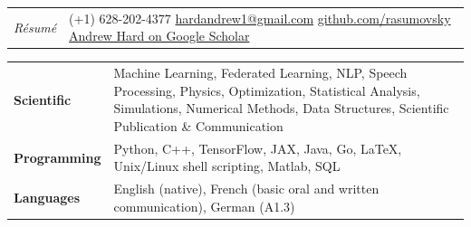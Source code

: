 \documentclass{letter}
\begin{document}

\begin{tabular}{p{}p{}}
  \hfill \newline \href{https://ch.linkedin.com/in/andrew-hard-25b690a5}{\Huge{\color{Maroon}{Andrew Hard}}} \newline \LARGE{\textit{R\'{e}sum\'{e}}} \newline
  &
  \hfill \newline %
  (+1) 628-202-4377 \newline
  \href{mailto:hardandrew1@gmail.com}{hardandrew1@gmail.com} \newline
  \href{https://github.com/rasumovsky}{github.com/rasumovsky} \newline
  \href{https://scholar.google.com/citations?hl=en&user=hJBLsu8AAAAJ}{Andrew Hard on Google Scholar}\\
\end{tabular}



\begin{flushleft}
  \Large{\textsc{\textbf{\color{Maroon}{Skills}}}}
  \vspace{1pt}  %
\end{flushleft}

\begin{tabular}{p{}p{}}

  {\bf Scientific} 
  &
  Machine Learning, Federated Learning, NLP, Speech Processing, Physics, Optimization, Statistical Analysis, Simulations, Numerical Methods, Data Structures, Scientific Publication \& Communication \newline
  \\


  {\bf Programming} 
  &
  Python, C++, TensorFlow, JAX, Java, Go, \LaTeX{}, Unix/Linux shell scripting, Matlab, SQL \newline
  \\ 

  {\bf Languages}
  &
  English (native), French (basic oral and written communication), German (A1.3)
\end{tabular}
\end{document}
